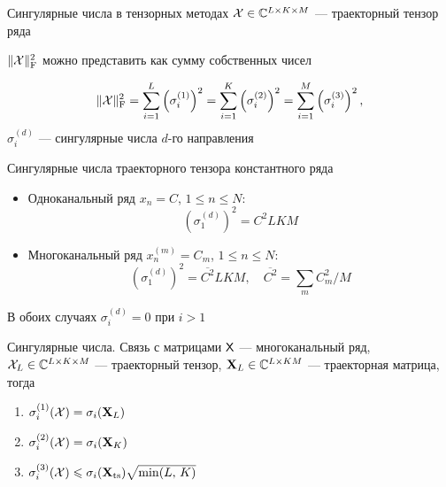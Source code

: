 \documentclass[pdf, unicode, 10pt, notheorems, handout]{beamer}
\newcommand{\bluetext}[1]{{\usebeamercolor[fg]{bluetext_color}#1}}
\begin{document}
\begin{frame}{Сингулярные числа в тензорных методах}
  $\mathcal{X}\in\mathbb{C}^{L\times K\times M}$ --- траекторный тензор ряда\smallskip

  $\|\mathcal{X}\|_{\mathrm{F}}^2$ можно представить как сумму собственных чисел\smallskip

  \[
    \|\mathcal{X}\|^2_{\mathrm{F}} = \sum_{i=1}^L\left(\sigma_{i}^{(1)}\right)^2
    = \sum_{i=1}^K\left(\sigma_{i}^{(2)}\right)^2
    = \sum_{i=1}^M\left(\sigma_{i}^{(3)}\right)^2,
  \]
  $\sigma_i^{(d)}$ --- сингулярные числа $d$-го направления\medskip

  \bluetext{Сингулярные числа траекторного тензора константного ряда}
  \begin{itemize}
    \item Одноканальный ряд $x_n = C$, $1 \leqslant n \leqslant N$:\\
      \[
        \left(\sigma_1^{(d)}\right)^2 = C^2 LKM
      \] \smallskip
    \item Многоканальный ряд $x_n^{(m)} = C_m$, $1 \leqslant n
      \leqslant N$:\\
      \[
        \left(\sigma_1^{(d)}\right)^2 = \overline{C^2} LKM, \quad
        \overline{C^2} =
        \sum_m C_m^2 / M
      \]
  \end{itemize}
  В обоих случаях $\sigma_i^{(d)} = 0$ при $i > 1$
\end{frame}

\begin{frame}{Сингулярные числа. Связь с матрицами}
  $\mathsf{X}$ --- многоканальный ряд, $\mathcal{X}_L\in\mathbb{C}^{L\times K\times M}$
  --- траекторный тензор,
  $\mathbf{X}_L\in \mathbb{C}^{L\times KM}$ --- траекторная матрица, тогда\smallskip

  \begin{enumerate}
    \item $\sigma_i^{(1)}(\mathcal{X}) = \sigma_i(\mathbf{X}_L)$\smallskip
    \item $\sigma_i^{(2)}(\mathcal{X}) = \sigma_i(\mathbf{X}_K)$\smallskip
    \item $\sigma_i^{(3)}(\mathcal{X}) \leqslant
      \sigma_i(\mathbf{X}_{\mathrm{ts}})\sqrt{\min(L,\, K)}$
  \end{enumerate}
\end{frame}
\end{document}
